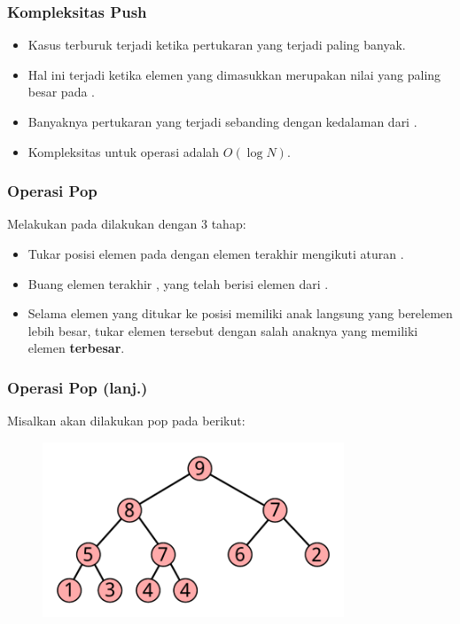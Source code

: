 \begin{frame}
\frametitle{Kompleksitas Push}
\begin{itemize}
  \item Kasus terburuk terjadi ketika pertukaran yang terjadi paling banyak.
  \item Hal ini terjadi ketika elemen yang dimasukkan merupakan nilai yang paling besar pada \pheap.
  \item Banyaknya pertukaran yang terjadi sebanding dengan kedalaman dari .
  \item Kompleksitas untuk operasi  adalah $O(\log{N})$.
\end{itemize}
\end{frame}

\begin{frame}
\frametitle{Operasi Pop}
Melakukan  pada \pbinaryHeap dilakukan dengan 3 tahap:
\begin{itemize}
  \item Tukar posisi elemen pada  dengan elemen terakhir mengikuti aturan .
  \item Buang elemen terakhir \pbinaryHeap, yang telah berisi elemen dari .
  \item Selama elemen yang ditukar ke posisi  memiliki anak langsung yang berelemen lebih besar, tukar elemen tersebut dengan salah anaknya yang memiliki elemen \textbf{terbesar}. 
\end{itemize}
\end{frame}

\begin{frame}
\frametitle{Operasi Pop (lanj.)}
Misalkan akan dilakukan pop pada \pheap berikut:
\begin{figure}
  \includegraphics[width=9cm]{asset/pop-1.pdf}
\end{figure}
\end{frame}

